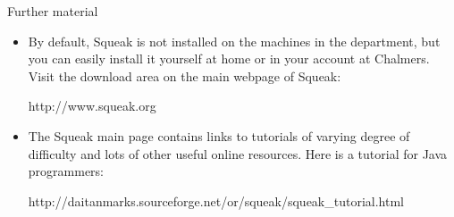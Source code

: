 \documentclass{article}
\begin{document}
Further material
\begin{itemize}
\item By default, Squeak is not installed on the machines in the department,
but you can easily install it yourself at home or in your account at
Chalmers. Visit the download area on the main webpage of Squeak:
\begin{center}
\textsf{http://www.squeak.org}
\end{center}
\item The Squeak main page contains links to tutorials of varying degree
of difficulty and lots of other useful online resources. Here is a 
tutorial for Java programmers:
\begin{center}
\textsf{http://daitanmarks.sourceforge.net/or/squeak/squeak\_tutorial.html}
\end{center}

\end{itemize}
\end{document}

